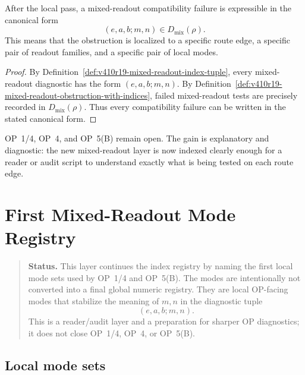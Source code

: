\begin{theorem}
\label{thm:v410r19-mixed-readout-index-clarification}
After the local pass, a mixed-readout compatibility failure is expressible in the canonical
form
\[
 (e,a,b;m,n)\in D_{\mathrm{mix}}(\rho).
\]
This means that the obstruction is localized to a specific route edge, a
specific pair of readout families, and a specific pair of local modes.
\end{theorem}

\begin{proof}
By Definition~\ref{def:v410r19-mixed-readout-index-tuple}, every mixed-readout
diagnostic has the form \((e,a,b;m,n)\). By
Definition~\ref{def:v410r19-mixed-readout-obstruction-with-indices}, failed
mixed-readout tests are precisely recorded in \(D_{\mathrm{mix}}(\rho)\).
Thus every compatibility failure can be written in the stated canonical form.
\end{proof}

\begin{remark}
\label{rem:v410r19-op-status}
OP~1/4, OP~4, and OP~5(B) remain open. The gain is explanatory and diagnostic:
the new mixed-readout layer is now indexed clearly enough for a reader or audit
script to understand exactly what is being tested on each route edge.
\end{remark}



\clearpage
\section{First Mixed-Readout Mode Registry}
\label{sec:v410r20-first-mixed-readout-mode-registry}

\begin{quote}\small
\noindent\textbf{Status.}
This layer continues the index registry by naming the first local mode sets
used by OP~1/4 and OP~5(B). The modes are intentionally not converted into a
final global numeric registry. They are local OP-facing modes that stabilize
the meaning of \(m,n\) in the diagnostic tuple
\[
 (e,a,b;m,n).
\]
This is a reader/audit layer and a preparation for sharper OP diagnostics; it
does not close OP~1/4, OP~4, or OP~5(B).
\end{quote}

\subsection{Local mode sets}
\label{subsec:v410r20-local-mode-sets}

